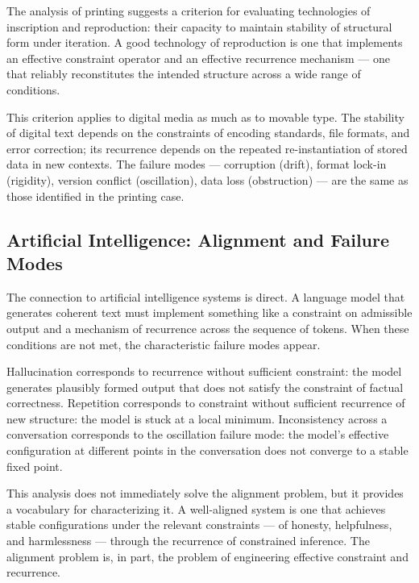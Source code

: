 \documentclass[12pt, oneside]{article}
\theoremstyle{definition}
\theoremstyle{remark}
\begin{document}
The analysis of printing suggests a criterion for evaluating technologies of inscription and reproduction: their capacity to maintain stability of structural form under iteration.
A good technology of reproduction is one that implements an effective constraint operator and an effective recurrence mechanism --- one that reliably reconstitutes the intended structure across a wide range of conditions.

This criterion applies to digital media as much as to movable type.
The stability of digital text depends on the constraints of encoding standards, file formats, and error correction; its recurrence depends on the repeated re-instantiation of stored data in new contexts.
The failure modes --- corruption (drift), format lock-in (rigidity), version conflict (oscillation), data loss (obstruction) --- are the same as those identified in the printing case.

\subsection{Artificial Intelligence: Alignment and Failure Modes}

The connection to artificial intelligence systems is direct.
A language model that generates coherent text must implement something like a constraint on admissible output and a mechanism of recurrence across the sequence of tokens.
When these conditions are not met, the characteristic failure modes appear.

Hallucination corresponds to recurrence without sufficient constraint: the model generates plausibly formed output that does not satisfy the constraint of factual correctness.
Repetition corresponds to constraint without sufficient recurrence of new structure: the model is stuck at a local minimum.
Inconsistency across a conversation corresponds to the oscillation failure mode: the model's effective configuration at different points in the conversation does not converge to a stable fixed point.

This analysis does not immediately solve the alignment problem, but it provides a vocabulary for characterizing it.
A well-aligned system is one that achieves stable configurations under the relevant constraints --- of honesty, helpfulness, and harmlessness --- through the recurrence of constrained inference.
The alignment problem is, in part, the problem of engineering effective constraint and recurrence.

\end{document}
